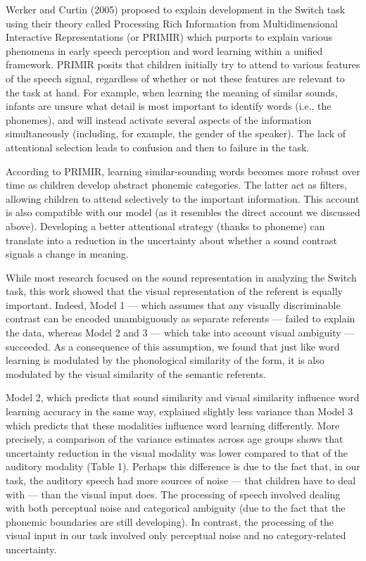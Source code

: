 \documentclass[english,,man,floatsintext]{apa6}
\theoremstyle{definition}
\theoremstyle{definition}
\theoremstyle{definition}
\theoremstyle{remark}
\begin{document}
Werker and Curtin (2005) proposed to explain development in the Switch
task using their theory called Processing Rich Information from
Multidimensional Interactive Representations (or PRIMIR) which purports
to explain various phenomena in early speech perception and word
learning within a unified framework. PRIMIR posits that children
initially try to attend to various features of the speech signal,
regardless of whether or not these features are relevant to the task at
hand. For example, when learning the meaning of similar sounds, infants
are unsure what detail is most important to identify words (i.e., the
phonemes), and will instead activate several aspects of the information
simultaneously (including, for example, the gender of the speaker). The
lack of attentional selection leads to confusion and then to failure in
the task.

According to PRIMIR, learning similar-sounding words becomes more robust
over time as children develop abstract phonemic categories. The latter
act as filters, allowing children to attend selectively to the important
information. This account is also compatible with our model (as it
resembles the direct account we discussed above). Developing a better
attentional strategy (thanks to phoneme) can translate into a reduction
in the uncertainty about whether a sound contrast signals a change in
meaning.

While most research focused on the sound representation in analyzing the
Switch task, this work showed that the visual representation of the
referent is equally important. Indeed, Model 1 --- which assumes that
any visually discriminable contrast can be encoded unambiguously as
separate referents --- failed to explain the data, whereas Model 2 and 3
--- which take into account visual ambiguity --- succeeded. As a
consequence of this assumption, we found that just like word learning is
modulated by the phonological similarity of the form, it is also
modulated by the visual similarity of the semantic referents.

Model 2, which predicts that sound similarity and visual similarity
influence word learning accuracy in the same way, explained slightly
less variance than Model 3 which predicts that these modalities
influence word learning differently. More precisely, a comparison of the
variance estimates across age groups shows that uncertainty reduction in
the visual modality was lower compared to that of the auditory modality
(Table 1). Perhaps this difference is due to the fact that, in our task,
the auditory speech had more sources of noise --- that children have to
deal with --- than the visual input does. The processing of speech
involved dealing with both perceptual noise and categorical ambiguity
(due to the fact that the phonemic boundaries are still developing). In
contrast, the processing of the visual input in our task involved only
perceptual noise and no category-related uncertainty.
\end{document}
